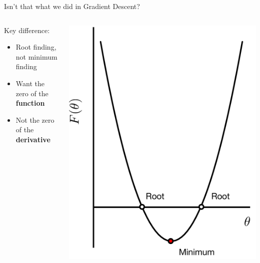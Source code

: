 \documentclass[aspectratio=169]{beamer}
\begin{document}
\begin{frame}{Isn't that what we did in Gradient Descent?}

\begin{columns}[T]
\begin{column}{0.65\textwidth}
Key difference:
\begin{itemize}
\item Root finding, not minimum finding
\item Want the zero of the \textbf{function}
\item Not the zero of the \textbf{derivative}
\end{itemize}
\end{column}
\begin{column}{0.35\textwidth}
\includegraphics[width=1\textwidth]{lectNM/rootVsMin.pdf}
\end{column}
\end{columns}
\end{frame}
\end{document}
